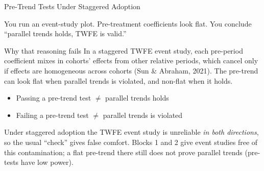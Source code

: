 \documentclass[main.tex]{subfiles}
\begin{document}
\begin{frame}{Pre-Trend Tests Under Staggered Adoption}

  You run an event-study plot. Pre-treatment coefficients look flat.
  You conclude ``parallel trends holds, TWFE is valid.''

  \medskip
  \begin{alertblock}{Why that reasoning fails}
    In a staggered TWFE event study, each pre-period coefficient
    mixes in \alert{cohorts' effects from other relative periods}, which cancel
    only if effects are homogeneous across cohorts (Sun \& Abraham, 2021). The pre-trend can look flat when parallel trends is
    violated, and non-flat when it holds.
  \end{alertblock}

  \medskip
  \begin{itemize}
    \item Passing a pre-trend test $\neq$ parallel trends holds
    \item Failing a pre-trend test $\neq$ parallel trends is violated
  \end{itemize}

  \medskip
  Under staggered adoption the TWFE event study is unreliable \emph{in both
  directions}, so the usual ``check'' gives false comfort. Blocks 1 and 2 give
  event studies free of this contamination; a flat pre-trend there still does not
  prove parallel trends (pre-tests have low power).

\end{frame}
\end{document}
